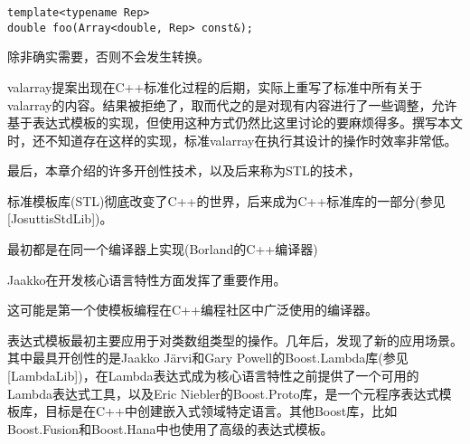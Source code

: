 \begin{lstlisting}[style=styleCXX]
template<typename Rep>
double foo(Array<double, Rep> const&);
\end{lstlisting}

除非确实需要，否则不会发生转换。

valarray提案出现在C++标准化过程的后期，实际上重写了标准中所有关于valarray的内容。结果被拒绝了，取而代之的是对现有内容进行了一些调整，允许基于表达式模板的实现，但使用这种方式仍然比这里讨论的要麻烦得多。撰写本文时，还不知道存在这样的实现，标准valarray在执行其设计的操作时效率非常低。

最后，本章介绍的许多开创性技术，以及后来称为STL的技术，

\begin{tcolorbox}[colback=webgreen!5!white,colframe=webgreen!75!black]
\hspace*{0.75cm}标准模板库(STL)彻底改变了C++的世界，后来成为C++标准库的一部分(参见[JosuttisStdLib])。
\end{tcolorbox}

最初都是在同一个编译器上实现(Borland的C++编译器)

\begin{tcolorbox}[colback=webgreen!5!white,colframe=webgreen!75!black]
\hspace*{0.75cm}Jaakko在开发核心语言特性方面发挥了重要作用。
\end{tcolorbox}

这可能是第一个使模板编程在C++编程社区中广泛使用的编译器。

表达式模板最初主要应用于对类数组类型的操作。几年后，发现了新的应用场景。其中最具开创性的是Jaakko J{\"a}rvi和Gary Powell的Boost.Lambda库(参见[LambdaLib])，在Lambda表达式成为核心语言特性之前提供了一个可用的Lambda表达式工具，以及Eric Niebler的Boost.Proto库，是一个元程序表达式模板库，目标是在C++中创建嵌入式领域特定语言。其他Boost库，比如Boost.Fusion和Boost.Hana中也使用了高级的表达式模板。




































